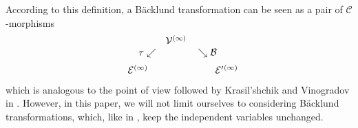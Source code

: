\documentclass[12pt,english]{elsarticle}
\theoremstyle{plain}
\theoremstyle{plain}
\theoremstyle{remark}
\theoremstyle{plain}
\theoremstyle{definition}
\theoremstyle{definition}
\begin{document}
  According to this definition, a B\"{a}cklund transformation can be seen
as a pair of $\mathcal{C}$-morphisms
%
\begin{equation*}
%
\begin{array}{c@{\quad}c@{\quad}c}
& \mathcal{V}^{(\infty )}
\\
\qquad \tau \swarrow
\vspace{3pt}
& & \searrow \mathcal{B}
\vspace{3pt}
\qquad
\\
\mathcal{E}^{(\infty )} & & \qquad \mathcal{E}'{}^{(\infty )}
\end{array}
%
\end{equation*}
%
which is analogous to the point of view followed by Krasil'shchik and Vinogradov
in \cite{Kras-Vin}. However, in this paper, we will not limit ourselves
to considering B\"{a}cklund transformations, which, like in
\cite{Kras-Vin}, keep the independent variables unchanged.
\end{document}
